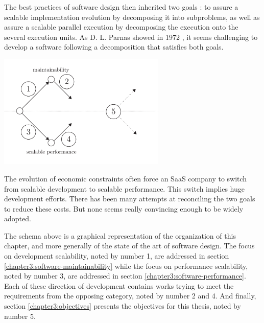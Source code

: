 The best practices of software design then inherited two goals : to assure a scalable implementation evolution by decomposing it into subproblems, as well as assure a scalable parallel execution by decomposing the execution onto the several execution units.
As D. L. Parnas showed in 1972 \cite{Parnas1972}, it seems challenging to develop a software following a decomposition that satisfies both goals.

\begin{center}
\includegraphics[width=0.6\textwidth]{../ressources/state-of-the-art.pdf}
\end{center}

The evolution of economic constraints often force an SaaS company to switch from scalable development to scalable performance.
This switch implies huge development efforts.
There has been many attempts at reconciling the two goals to reduce these costs.
But none seems really convincing enough to be widely adopted.

The schema above is a graphical representation of the organization of this chapter, and more generally of the state of the art of software design.
The focus on development scalability, noted by number 1, are addressed in section \ref{chapter3:software-maintainability} while the focus on performance scalability, noted by number 3, are addressed in section \ref{chapter3:software-performance}.
Each of these direction of development contains works trying to meet the requirements from the opposing category, noted by number 2 and 4.
And finally, section \ref{chapter3:objectives} presents the objectives for this thesis, noted by number 5.







                                    \endinput


